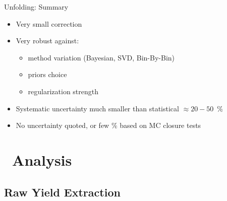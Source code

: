 \documentclass[xcolor={usenames,dvipsnames}]{beamer}
\begin{document}
\begin{frame}{Unfolding: Summary}
\begin{itemize}
\item Very small correction
\item Very robust against:
\begin{itemize}
\item method variation (Bayesian, SVD, Bin-By-Bin)
\item priors choice
\item regularization strength
\end{itemize}
\item Systematic uncertainty much smaller than statistical $\approx 20-50$~\%
\item No uncertainty quoted, or few \% based on MC closure tests
\end{itemize}
\end{frame}

\section{\pPb\ Analysis}

\subsection{Raw Yield Extraction}
\end{document}
